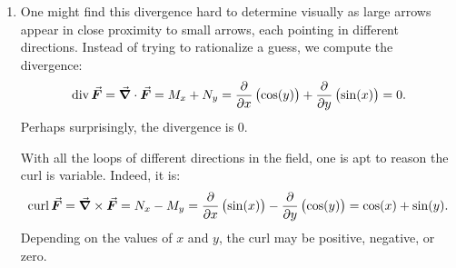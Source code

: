 \begin{example}
\begin{enumerate}
	\item	One might find this divergence hard to determine visually as large arrows appear in close proximity to small arrows, each pointing in different directions. Instead of trying to rationalize a guess, we compute the divergence:
	$$\divv\vec F = \vec{\nabla} \cdot \vec F = M_x + N_y = \frac{\partial}{\partial x}\left(\cos(y)\right) + \frac{\partial}{\partial y}\left(\sin(x)\right) = 0.$$ 
	Perhaps surprisingly, the divergence is 0.
	
	With all the loops of different directions in the field, one is apt to reason the curl is variable. Indeed, it is:
	$$\curl \vec F = \vec{\nabla}\times\vec F = N_x-M_y = \frac{\partial}{\partial x}\left(\sin(x)\right) - \frac{\partial}{\partial y}\left(\cos(y)\right) = \cos(x) + \sin(y).$$
	Depending on the values of $x$ and $y$, the curl may be positive, negative, or zero.
\end{enumerate}



\end{example}



